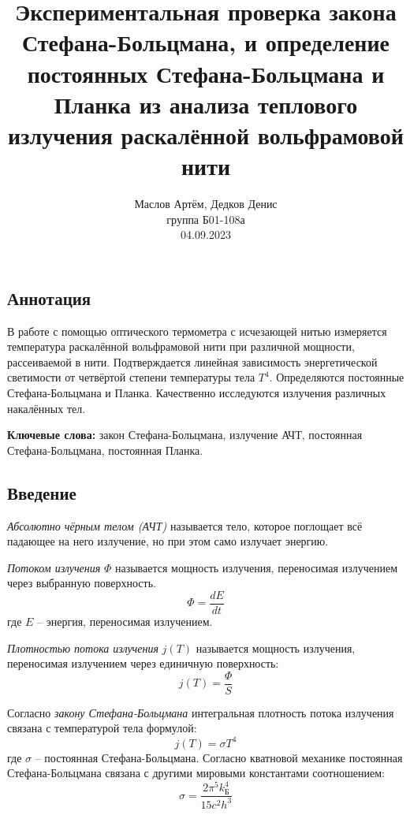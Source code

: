 \documentclass[10pt,a4paper]{article}
\author{\normalsize Маслов Артём, Дедков Денис \\
	\normalsize группа Б01-108а \\
	\normalsize 04.09.2023}
\date{}
\title{
	\Large Экспериментальная проверка закона Стефана-Больцмана, и определение постоянных Стефана-Больцмана и Планка из анализа теплового излучения раскалённой вольфрамовой нити \\ 
}
\begin{document}
\maketitle
\begin{multicols}{2}
	
	\subsection*{Аннотация}
	В работе с помощью оптического термометра с исчезающей нитью измеряется температура раскалённой вольфрамовой нити при различной мощности, рассеиваемой в нити. Подтверждается линейная зависимость энергетической светимости от четвёртой степени температуры тела $T^4$. Определяются постоянные Стефана-Больцмана и Планка. Качественно исследуются излучения различных накалённых тел.
	
	\textbf{Ключевые слова:} закон Стефана-Больцмана, излучение АЧТ, постоянная Стефана-Больцмана, постоянная Планка.
	
	\subsection*{Введение}
	
	\textit{Абсолютно чёрным телом (АЧТ)} называется тело, которое поглощает всё падающее на него излучение, но при этом само излучает энергию. 
	
	\textit{Потоком излучения} $\Phi$ называется мощность излучения, переносимая излучением через выбранную поверхность.
	$$
	\Phi = \frac{dE}{dt}
	$$
	где $E$ -- энергия, переносимая излучением.
	
	\textit{Плотностью потока излучения} $j(T)$ называется мощность излучения, переносимая излучением через единичную поверхность:
	$$
	j(T) = \frac{\Phi}{S}
	$$
	
	Согласно \textit{закону Стефана-Больцмана} интегральная плотность потока излучения связана с температурой тела формулой:
	\begin{equation}
		j(T) = \sigma T^4
		\label{eq:stefan_boltzman_law}
	\end{equation}
	где $\sigma$ -- постоянная Стефана-Больцмана. Согласно кватновой механике \cite[раздел~VIII]{labnik} постоянная Стефана-Больцмана связана с другими мировыми константами соотношением:
	\begin{equation}
		\sigma = \frac{2 \pi^5 k_Б^4}{15 c^2 h^3}
		\label{eq:const_stefan_boltzmann}
	\end{equation}
	

\end{multicols}
\end{document}
